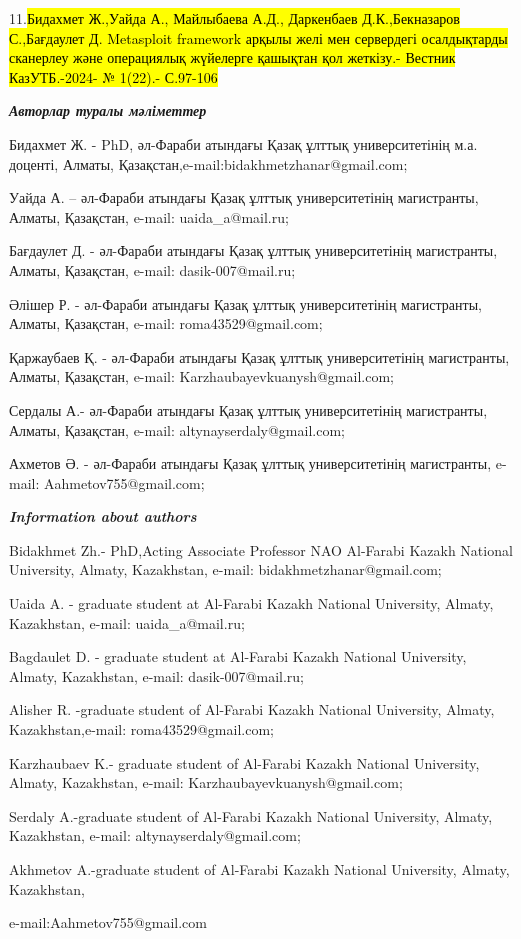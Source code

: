 11.\hl{Бидахмет Ж.,Уайда А., Майлыбаева А.Д., Даркенбаев Д.К.,Бекназаров
С.,Бағдаулет Д. Metasploit framework арқылы желі мен сервердегі
осалдықтарды сканерлеу және операциялық жүйелерге қашықтан қол жеткізу.-
Вестник КазУТБ.-2024- № 1(22).- С.97-106}

\emph{\textbf{Авторлар туралы мәліметтер}}

Бидахмет Ж. - PhD, әл-Фараби атындағы Қазақ ұлттық университетінің м.а.
доценті, Алматы, Қазақстан,e-mail:bidakhmetzhanar@gmail.com;

Уайда А. -- әл-Фараби атындағы Қазақ ұлттық университетінің магистранты,
Алматы, Қазақстан, e-mail: uaida\_a@mail.ru;

Бағдаулет Д. - әл-Фараби атындағы Қазақ ұлттық университетінің
магистранты, Алматы, Қазақстан, e-mail: dasik-007@mail.ru;

Әлішер Р. - әл-Фараби атындағы Қазақ ұлттық университетінің магистранты,
Алматы, Қазақстан, e-mail: roma43529@gmail.com;

Қаржаубаев Қ. - әл-Фараби атындағы Қазақ ұлттық университетінің
магистранты, Алматы, Қазақстан, e-mail: Karzhaubayevkuanysh@gmail.com;

Сердалы А.- әл-Фараби атындағы Қазақ ұлттық университетінің магистранты,
Алматы, Қазақстан, e-mail: altynayserdaly@gmail.com;

Ахметов Ә. - әл-Фараби атындағы Қазақ ұлттық университетінің
магистранты, e-mail: Aahmetov755@gmail.com;

\emph{\textbf{Information about authors}}

Bidakhmet Zh.- PhD,Acting Associate Professor NAO Al-Farabi Kazakh
National University, Almaty, Kazakhstan, e-mail:
bidakhmetzhanar@gmail.com;

Uaida A. - graduate student at Al-Farabi Kazakh National University,
Almaty, Kazakhstan, e-mail: uaida\_a@mail.ru;

Bagdaulet D. - graduate student at Al-Farabi Kazakh National University,
Almaty, Kazakhstan, e-mail: dasik-007@mail.ru;

Alisher R. -graduate student of Al-Farabi Kazakh National University,
Almaty, Kazakhstan,e-mail: roma43529@gmail.com;

Karzhaubaev K.- graduate student of Al-Farabi Kazakh National
University, Almaty, Kazakhstan, e-mail: Karzhaubayevkuanysh@gmail.com;

Serdaly A.-graduate student of Al-Farabi Kazakh National University,
Almaty, Kazakhstan, e-mail: altynayserdaly@gmail.com;

Akhmetov A.-graduate student of Al-Farabi Kazakh National University,
Almaty, Kazakhstan,

e-mail:Aahmetov755@gmail.com
